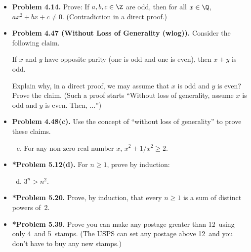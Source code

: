 \documentclass[11pt]{article}
\begin{document}
\begin{itemize}
\vspace{0.1in}

\item \textbf{Problem 4.14.}
  Prove: If $a,b,c\in\Z$ are odd, then for all $x\in\Q$,
  $ax^2+bx+c\ne 0$.
  (Contradiction in a direct proof.)

\newpage


\item \textbf{Problem 4.47 (Without Loss of Generality (wlog)).}
  Consider the following claim.
  \begin{center}
  If $x$ and $y$ have opposite parity (one is odd and one is even),
  then $x+y$ is odd.
  \end{center}
  Explain why, in a direct proof, we may assume that $x$ is odd and $y$ is even?
  Prove the claim.
  (Such a proof starts ``Without loss of generality, assume $x$ is odd and $y$ is even.
  Then, $\ldots$'')

\vspace{0.1in}

\item \textbf{Problem 4.48(c).}
  Use the concept of ``without loss of generality'' to prove these claims.
  \begin{enumerate}[(a)]
  \setcounter{enumi}{2}
  \item For any non-zero real number $x$, $x^2+1/x^2\ge 2$.
  \end{enumerate}

\vspace{0.1in}


\item \textbf{*Problem 5.12(d).}
  For $n\ge 1$, prove by induction:
  \begin{enumerate}[(a)]
  \setcounter{enumi}{3}
  \item $3^n>n^2$.
  \end{enumerate}

\vspace{0.1in}

\item \textbf{*Problem 5.20.}
  Prove, by induction, that every $n\ge 1$ is a sum of distinct powers of~2.

\vspace{0.1in}

\item \textbf{*Problem 5.39.}
  Prove you can make any postage greater than 12\textcent\
  using only 4\textcent\  and 5\textcent\  stamps.
  (The USPS can set any postage above 12\textcent\  and you don't have to buy any new stamps.)


\end{itemize}
\end{document}
